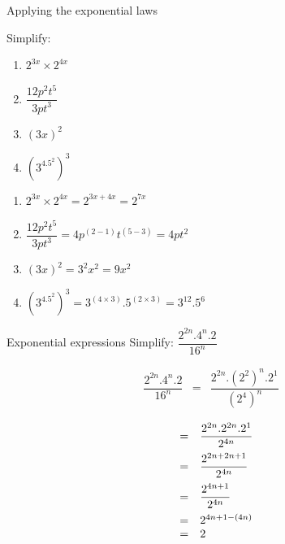 \begin{wex}
{ %
Applying the exponential laws
}
{%
Simplify:

\begin{enumerate}[itemsep=6pt, label=\textbf{\arabic*}.]
\item  $2^{3x} \times 2^{4x}$
 \item $\dfrac{12p^2t^5}{3pt^3}$
 \item $ (3x)^2 $
 \item $(3^4.5^2)^3$\\
\end{enumerate}

}
{%

\begin{enumerate}[itemsep=6pt, label=\textbf{\arabic*}.]
\item  $2^{3x} \times 2^{4x} = 2^{3x+4x} = 2^{7x}$
 \item $\dfrac{12p^2t^5}{3pt^3} = 4p^{(2-1)}t^{(5-3)} = 4pt^2$
 \item $ (3x)^2 = 3^2x^2 = 9x^2$
 \item $(3^4.5^2)^3 = 3^{(4\times3)}.5^{(2\times3)} = 3^{12}.5^6  $
\end{enumerate}

}


\end{wex}


\begin{wex}
{
Exponential expressions
}
{
Simplify: $\dfrac{2^{2n} .4^n . 2 }{ 16^n} $
}
{

\begin{eqnarray*}
\dfrac{2^{2n} . 4^n . 2 }{ 16^n} & = &\dfrac{2^{2n} . (2^2)^n . 2^1 }{ (2^4)^n} 
\end{eqnarray*}


\begin{equation*}
 \begin{array}{rcl}
   &= & \dfrac{ 2^{2n} . 2^{2n} . 2^1 }{ 2^{4n} } \vspace{5pt}\\
& = & \dfrac{ 2^{2n + 2n +1}}{2^{4n}} \vspace{5pt}\\
& = & \dfrac{2^{4n+1}}{2^{4n}} \vspace{5pt}\\
& = & 2^{4n+1-(4n)} \\
& = & 2
 \end{array}

\end{equation*}


 
}
\end{wex}


